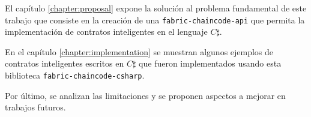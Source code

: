El capítulo \ref{chapter:proposal} expone la solución al problema fundamental de este trabajo que consiste en la creación de una \texttt{fabric-chaincode-api} que permita la implementación de contratos inteligentes en el lenguaje $ C\sharp $.

En el capítulo \ref{chapter:implementation} se muestran algunos  ejemplos de contratos inteligentes escritos en $ C\sharp $ que fueron implementados usando esta biblioteca \texttt{fabric-chaincode-csharp}. 

Por último, se analizan las limitaciones y se proponen aspectos a mejorar en trabajos futuros.













